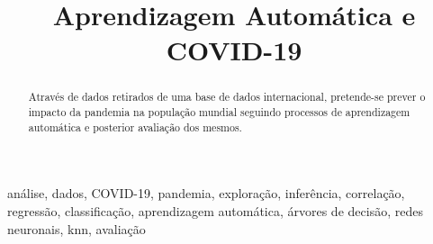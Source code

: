 \documentclass[conference]{IEEEtran}
\begin{document}
\title{Aprendizagem Automática e COVID-19\\
}

\author{
\and
{}
}

\maketitle

\begin{abstract}
Através de dados retirados de uma base de dados internacional, pretende-se prever o impacto da pandemia na população mundial seguindo processos de aprendizagem automática e posterior avaliação dos mesmos.
\end{abstract}

\begin{IEEEkeywords}
análise, dados, COVID-19, pandemia, exploração, inferência, correlação, regressão, classificação, aprendizagem automática, árvores de decisão, redes neuronais, knn, avaliação
\end{IEEEkeywords}
\end{document}
